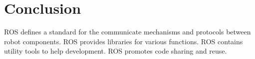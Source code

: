 \documentclass[a4paper, 10pt, conference]{ieeeconf}       %
\begin{document}
\section{Conclusion}



   ROS defines a standard for the communicate mechanisms and protocols between robot components.
   ROS provides libraries for various functions.
   ROS contains utility tools to help development.
   ROS promotes code sharing and reuse.



  
\end{document}
